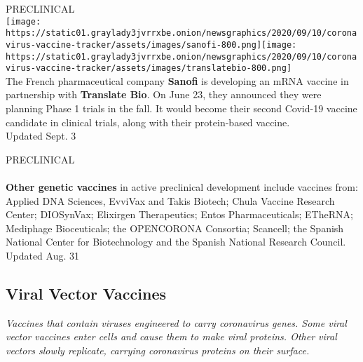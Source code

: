 PRECLINICAL\\
\texttt{[image: https://static01.graylady3jvrrxbe.onion/newsgraphics/2020/09/10/coronavirus-vaccine-tracker/assets/images/sanofi-800.png]}\texttt{[image: https://static01.graylady3jvrrxbe.onion/newsgraphics/2020/09/10/coronavirus-vaccine-tracker/assets/images/translatebio-800.png]}\\
The French pharmaceutical company \textbf{\textbf{Sanofi}} is developing
an mRNA vaccine in partnership with \textbf{\textbf{Translate Bio}}. On
June 23, they announced they were planning Phase 1 trials in the fall.
It would become their second Covid-19 vaccine candidate in clinical
trials, along with their protein-based vaccine.\\
Updated Sept. 3

PRECLINICAL\\
~\\
 \textbf{\textbf{Other genetic vaccines}} in active preclinical
development include vaccines from: Applied DNA Sciences, EvviVax and
Takis Biotech; Chula Vaccine Research Center; DIOSynVax; Elixirgen
Therapeutics; Entos Pharmaceuticals; ETheRNA; Mediphage Bioceuticals;
the OPENCORONA Consortia; Scancell; the Spanish National Center for
Biotechnology and the Spanish National Research Council.\\
Updated Aug. 31

\hypertarget{viral-vector-vaccines}{%
\subsection{\texorpdfstring{\textbf{Viral Vector
Vaccines}}{Viral Vector Vaccines}}\label{viral-vector-vaccines}}

\emph{Vaccines that contain viruses engineered to carry coronavirus
genes. Some viral vector vaccines enter cells and cause them to make
viral proteins. Other viral vectors slowly replicate, carrying
coronavirus proteins on their surface.}

